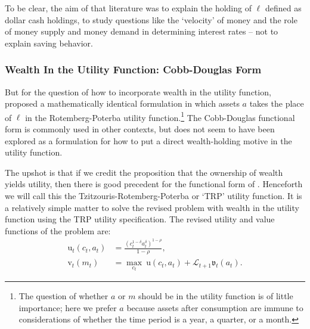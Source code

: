 \documentclass{article}
\newcommand{\CRRA}{\rho}
\newcommand{\uFunc}{\mathrm{u}}
\newcommand{\vFunc}{\mathrm{v}}
\newcommand{\Alive}{\mathcal{L}}
\newcommand{\cNrm}{c}
\newcommand{\aNrm}{a}
\newcommand{\mNrm}{m}
\newcommand{\lqdt}{\ell}
\begin{document}
To be clear, the aim of that literature was to explain the holding of $\lqdt$ defined as dollar cash holdings, to study questions like the `velocity' of money and the role of money supply and money demand in determining interest rates -- not to explain saving behavior.

\subsubsection{Wealth In the Utility Function: Cobb-Douglas Form}

But for the question of how to incorporate wealth in the utility function, \cite{Tzitzouris2024} proposed a mathematically identical formulation in which assets $\aNrm$ takes the place of $\lqdt$ in the Rotemberg-Poterba utility function.\footnote{The question of whether $\aNrm$ or $\mNrm$ should be in the utility function is of little importance; here we prefer $\aNrm$ because assets after consumption are immune to considerations of whether the time period is a year, a quarter, or a month.}
The Cobb-Douglas functional form is commonly used in other contexts, but does not seem to have been explored as a formulation for how to put a direct wealth-holding motive in the utility function.


The upshot is that if we credit the proposition that the ownership of wealth yields utility, then there is good precedent for the functional form of \cite{Tzitzouris2024}.
Henceforth we will call this the Tzitzouris-Rotemberg-Poterba or `TRP' utility function.
It is a relatively simple matter to solve the revised problem with wealth in the utility function using the TRP utility specification. The revised utility and value functions of the problem are:
\begin{align}
    \uFunc_t(\cNrm_t, \aNrm_t) & = \frac{\left(\cNrm_t^{1-\delta}\aNrm_t^{\delta}\right)^{1-\CRRA}}{1-\CRRA}, \\
    {\vFunc}_{t}({\mNrm}_{t}) & = \max_{\cNrm_{t}} ~ \uFunc(\cNrm_{t}, \aNrm_{t})+\Alive_{t+1}\mathfrak{v}_{t}(a_{t}).
\end{align}

\end{document}
